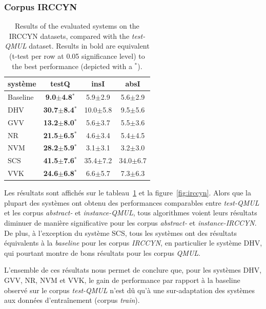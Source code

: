 \subsubsection{Corpus IRCCYN}

\begin{table}
\begin{center} 
\begin{tabular}{lccc}
système  & testQ                     & insI         & absI \\ 
\hline 
Baseline & \textbf{9.0$\pm$4.8$^*$}  &  5.9$\pm$2.9 &  5.6$\pm$2.9 \\ 
DHV      & \textbf{30.7$\pm$8.4$^*$} & 10.0$\pm$5.8 &  9.5$\pm$5.6 \\ 
GVV      & \textbf{13.2$\pm$8.0$^*$} &  5.6$\pm$3.7 &  5.5$\pm$3.6 \\
NR       & \textbf{21.5$\pm$6.5$^*$} &  4.6$\pm$3.4 &  5.4$\pm$4.5 \\ 
NVM      & \textbf{28.2$\pm$5.9$^*$} &  3.1$\pm$3.1 &  3.2$\pm$3.0 \\ 
SCS      & \textbf{41.5$\pm$7.6$^*$} & 35.4$\pm$7.2 & 34.0$\pm$6.7 \\ 
VVK      & \textbf{24.6$\pm$6.8$^*$} &  6.6$\pm$5.7 &  7.3$\pm$6.3 \\ 
\hline
\end{tabular} 
\end{center}  
\caption{Results of the evaluated systems on the IRCCYN datasets, compared with the \emph{test-QMUL} dataset. Results in bold are equivalent (t-test per row at 0.05 significance level) to the best performance (depicted with a $^*$).}
\label{tab:irccyn} 
\end{table} 

Les résultats sont affichés sur le tableau~\ref{tab:irccyn} et la figure~\ref{fig:irccyn}. Alors que la plupart des systèmes ont obtenu des performances comparables entre \emph{test-QMUL} et les corpus \emph{abstract-} et \emph{instance-QMUL}, tous algorithmes voient leurs résultats diminuer de manière significative pour les corpus  \emph{abstract-} et \emph{instance-IRCCYN}. De plus, à l'exception du système SCS, tous les systèmes ont des résultats équivalents à la \emph{baseline} pour les corpus \emph{IRCCYN}, en particulier le système DHV, qui pourtant montre de bons résultats pour les corpus \emph{QMUL}.

L'ensemble de ces résultats nous permet de conclure que, pour les systèmes DHV, GVV, NR, NVM et VVK, le gain de performance par rapport à la baseline observé sur le corpus \emph{test-QMUL} n'est dû qu'à une sur-adaptation des systèmes aux données d'entraînement (corpus \emph{train}). 


